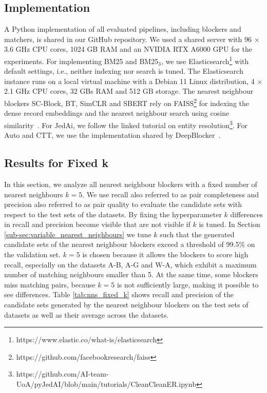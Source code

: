 \documentclass[sigconf,nonacm]{acmart}
\begin{document}
\subsection{Implementation}
\label{sub-sec:implementation}
A Python implementation of all evaluated pipelines, including blockers and matchers, is shared in our GitHub repository.
We used a shared server with 96 $\times$ 3.6 GHz CPU cores, 1024 GB RAM and an NVIDIA RTX A6000 GPU for the experiments.
For implementing BM25 and BM25$_{3}$, we use Elasticsearch\footnote{https://www.elastic.co/what-is/elasticsearch} with default settings, i.e., neither indexing nor search is tuned.
The Elasticsearch instance runs on a local virtual machine with a Debian 11 Linux distribution, 4 $\times$ 2.1 GHz CPU cores, 32 GBs RAM and 512 GB storage.
The nearest neighbour blockers SC-Block, BT, SimCLR and SBERT rely on FAISS\footnote{https://github.com/facebookresearch/faiss} for indexing the dense record embeddings and the nearest neighbour search using cosine similarity~\cite{johnson_billion-scale_2021}. 
For JedAi, we follow the linked tutorial on entity resolution\footnote{https://github.com/AI-team-UoA/pyJedAI/blob/main/tutorials/CleanCleanER.ipynb}. For Auto and CTT, we use the implementation shared by DeepBlocker~\cite{thirumuruganathan_deep_2021}.













\subsection{Results for Fixed k}
\label{sub-sec:fix_nearest_neighbours}

In this section, we analyze all nearest neighbour blockers with a fixed number of nearest neighbours $k=5$.
We use recall also referred to as pair completeness and precision also referred to as pair quality to evaluate the candidate sets with respect to the test sets of the datasets.
By fixing the hyperparameter $k$ differences in recall and precision become visible that are not visible if $k$ is tuned.
In Section \ref{sub-sec:variable_nearest_neighbours} we tune $k$ such that the generated candidate sets of the nearest neighbour blockers exceed a threshold of 99.5\% on the validation set.
$k=5$ is chosen because it allows the blockers to score high recall, especially on the datasets A-B, A-G and W-A, which exhibit a maximum number of matching neighbours smaller than 5. At the same time, some blockers miss matching pairs, because $k=5$ is not sufficiently large, making it possible to see differences.
Table \ref{tab:nns_fixed_k} shows recall and precision of the candidate sets generated by the nearest neighbour blockers on the test sets of datasets as well as their average across the datasets.
\end{document}

